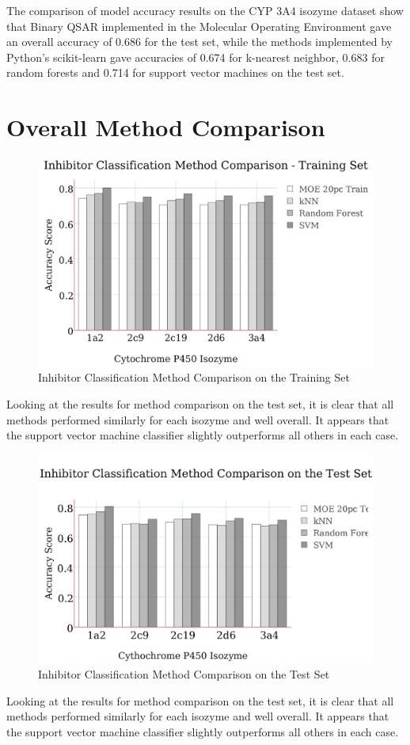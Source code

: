 The comparison of model accuracy results on the CYP 3A4 isozyme dataset show that Binary QSAR implemented in the Molecular Operating Environment gave an overall accuracy of 0.686 for the test set, while the methods implemented by Python's scikit-learn gave accuracies of 0.674 for k-nearest neighbor, 0.683 for random forests and 0.714 for support vector machines on the test set.


\section{Overall Method Comparison}

\begin{figure}[H]
\includegraphics[width=1\textwidth]{../img/method_comparison_training_set.png}
\caption{Inhibitor Classification Method Comparison on the Training Set}
\end{figure}

Looking at the results for method comparison on the test set, it is clear that all methods performed similarly for each isozyme and well overall. It appears that the support vector machine classifier slightly outperforms all others in each case.

\begin{figure}[H]
\includegraphics[width=1\textwidth]{../img/method_comparison_test_set.png}
\caption{Inhibitor Classification Method Comparison on the Test Set}
\end{figure}

Looking at the results for method comparison on the test set, it is clear that all methods performed similarly for each isozyme and well overall. It appears that the support vector machine classifier slightly outperforms all others in each case.




